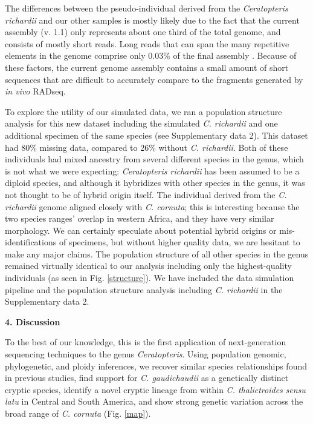 \documentclass[12pt]{article}
\begin{document}
\begin{flushleft}
The differences between the pseudo-individual derived from the \textit{Ceratopteris richardii} and our other samples is mostly likely due to the fact that the current assembly (v. 1.1) only represents about one third of the total genome, and consists of mostly short reads. Long reads that can span the many repetitive elements in the genome comprise only 0.03\% of the final assembly \autocite{Marchant2019}. Because of these factors, the current genome assembly contains a small amount of short sequences that are difficult to accurately compare to the fragments generated by \textit{in vivo} RADseq. 

To explore the utility of our simulated data, we ran a population structure analysis \autocite{Pritchard2000} for this new dataset including the simulated \textit{C. richardii} and one additional specimen of the same species (see Supplementary data 2). This dataset had 80\% missing data, compared to 26\% without \textit{C. richardii}. Both of these individuals had mixed ancestry from several different species in the genus, which is not what we were expecting: \textit{Ceratopteris richardii} has been assumed to be a diploid species, and although it hybridizes with other species in the genus, it was not thought to be of hybrid origin itself. The individual derived from the \textit{C. richardii} genome aligned closely with \textit{C. cornuta}; this is interesting because the two species ranges’ overlap in western Africa, and they have very similar morphology. We can certainly speculate about potential hybrid origins or mis-identifications of specimens, but without higher quality data, we are hesitant to make any major claims. The population structure of all other species in the genus remained virtually identical to our analysis including only the highest-quality individuals (as seen in Fig. \ref{structure}). We have included the data simulation pipeline and the population structure analysis including \textit{C. richardii} in the Supplementary data 2.

\vspace{1cm}

{\large\textbf{4. Discussion}}

To the best of our knowledge, this is the first application of next-generation sequencing techniques to the genus \textit{Ceratopteris}. Using population genomic, phylogenetic, and ploidy inferences, we recover similar species relationships found in previous studies, find support for \textit{C. gaudichaudii} as a genetically distinct cryptic species, identify a novel cryptic lineage from within \textit{C. thalictroides} \textit{sensu latu} in Central and South America, and show strong genetic variation across the broad range of \textit{C. cornuta} (Fig. \ref{map}).


\end{flushleft}
\end{document}
